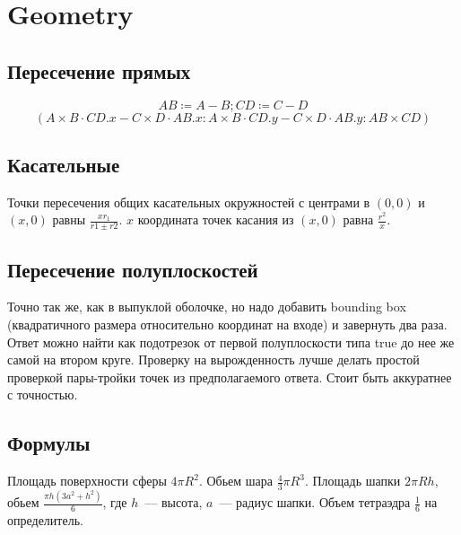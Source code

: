\section{Geometry}

\subsection{Пересечение прямых}

\begin{equation*}
	AB \coloneqq A - B; CD \coloneqq C - D
\end{equation*}
\begin{equation*}
	(A \times B \cdot CD.x - C \times D \cdot AB.x : A \times B \cdot CD.y - C \times D \cdot AB.y : AB \times CD)
\end{equation*}

\subsection{Касательные}

Точки пересечения общих касательных окружностей с центрами в $(0, 0)$ и $(x, 0)$ равны $\frac{x r_1}{r1 \pm r2}$.
$x$ координата точек касания из $(x, 0)$ равна $\frac{r^2}{x}$.

\subsection{Пересечение полуплоскостей}

Точно так же, как в выпуклой оболочке, но надо добавить bounding box (квадратичного размера относительно координат на входе) и завернуть два раза.
Ответ можно найти как подотрезок от первой полуплоскости типа true до нее же самой на втором круге.
Проверку на вырожденность лучше делать простой проверкой пары-тройки точек из предполагаемого ответа. Стоит быть аккуратнее с точностью.

\subsection{Формулы}

Площадь поверхности сферы $4 \pi R^2$. Обьем шара $\frac43 \pi R^3$. Площадь шапки $2 \pi R h$, обьем $\frac{\pi h (3a^2+h^2)}{6}$, где $h$~--- высота, $a$~--- радиус шапки. Объем тетраэдра $\frac16$ на определитель.
